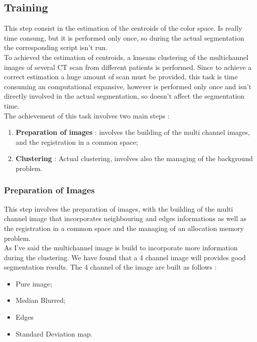 
	
	\subsection{Training}
	
	This step consist in the estimation of the centroids of the color space. Is really time consung, but it is performed only once, so during the actual segmentation the corresponding script isn't run.\\
	To achieved the estimation of centroids, a kmeans clustering of the multichannel images of several CT scan from different patients is performed. 
	Since to achieve a correct estimation a huge amount of scan must be provided, this task is time consuming an computational expansive, however is performed only once and isn't directly involved in the actual segmentation, so doesn't affect the segmentation time.\\
	The achievement of this task involves two main steps : 
	\begin{enumerate}
		\item \textbf{Preparation of images} : involves the building of the multi channel images, and the registration in a common space; 
		\item \textbf{Clustering} : Actual clustering, involves also the managing of the background problem.
	\end{enumerate}

		\subsubsection*{Preparation of Images} 
	
		This step involves the preparation of images, with the building of the multi channel image that incorporates neighbouring and edges informations as well as the registration in a common space and the managing of an allocation memory problem.\\
		
		As I've said the multichannel image is build to incorporate more information during the clustering. We have found that a 4 channel image will provides good segmentation results. The 4 channel of the image are built as follows  : 
		\begin{itemize}
			\item Pure image; 
			\item Median Blurred; 
			\item Edges 
			\item Standard Deviation map. 
		\end{itemize}
	
